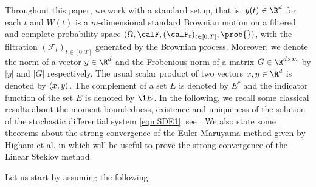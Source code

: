 
Throughout this paper, 
we work with a standard setup, that is,  $y(t)\in \R^d$ for each 
$t$ and  $W(t)$ is a
$m$-dimensional standard Brownian motion on a filtered and complete probability space
$	(
		\Omega ,\calF,(\calF_t)_{t\in[0,T]},\prob{}
	)$,
with the filtration
$(\mathcal{F}_t)_{t\in[0,T]}$  generated by the Brownian process.  Moreover,
we denote  the norm of a vector $y\in \R^d$ and the Frobenious norm 
of a matrix $G\in \R^{d\times m}$  by $|y|$ and $|G|$ respectively. The usual scalar product of two vectors 
$x,y\in \R^d$ is denoted by $\left\langle x, y\right\rangle$.  The complement of a set $E$ is denoted by $E^c$ and 
the indicator function  of the set $E$ is denoted by $\1{E}$. 
In the following, we recall some classical results  about the moment boundedness, existence 
and uniqueness of the solution of the stochastic differential system \eqref{eqn:SDE1}, 
see \cite{Higham2002b,Mao2013,Mao2007}. We  also state some theorems about the strong 
convergence of the Euler-Maruyama method given by Higham et al. in \cite{Higham2002b} which will be useful 
 to prove the strong convergence of the Linear Steklov method. 
 
Let us start by assuming the following:


	


